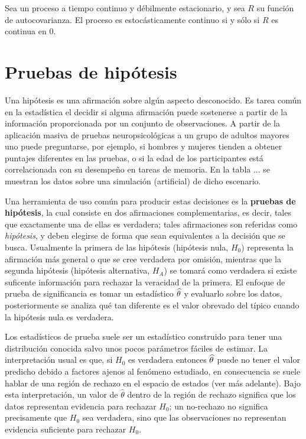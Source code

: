 \begin{proposicion}
Sea \xt un proceso a tiempo continuo y débilmente estacionario, y sea $R$ su función de autocovarianza. El proceso es estocásticamente continuo si y sólo si $R$ es continua en 0.
\end{proposicion}


\section{Pruebas de hipótesis}


Una hipótesis es una afirmación sobre algún aspecto desconocido.
%
Es tarea común en la estadística el decidir si alguna afirmación puede sostenerse a partir de la
información proporcionada por un conjunto de observaciones. 
%
A partir de la aplicación masiva de pruebas neuropsicológicas a un grupo de adultos mayores uno 
puede preguntarse, por ejemplo, si hombres y mujeres tienden a obtener puntajes diferentes en las
pruebas, o si la edad de los participantes está correlacionada con su desempeño en tareas de 
memoria.
%
En la tabla ... se muestran los datos sobre una simulación (artificial) de dicho escenario.

Una herramienta de uso común para producir estas decisiones es la \textbf{pruebas de hipótesis},
la cual consiste en dos afirmaciones complementarias, es decir, tales que exactamente una de ellas es verdadera; tales afirmaciones
son referidas como \textit{hipótesis}, y deben elegirse de forma que sean equivalentes a la 
decisión que se busca. 
%
Usualmente la primera de las hipótesis (hipótesis nula, $H_0$) representa la afirmación más general o que se cree verdadera por omisión, mientras que la segunda hipótesis (hipótesis alternativa, $H_A$) se tomará como verdadera si
existe suficente información para rechazar la veracidad de la primera.
%
%
El enfoque de prueba de significancia es  tomar un estadístico $\widehat{ \theta }$ y evaluarlo sobre los datos, posteriormente se analiza qué tan diferente es el valor obrevado del típico cuando la hipótesis nula es verdadera.

Los estadísticos de prueba suele ser un estadístico construido para tener una distribución conocida salvo unos pocos parámetros fáciles de estimar.
%
La interpretación usual es que, si $H_0$ es verdadera entonces $\widehat{ \theta }$ puede no tener el valor predicho debido a factores ajenos al fenómeno estudiado, en consecuencia se suele hablar de una región de rechazo en el espacio de estados (ver más adelante).
%
Bajo esta interpretación, un valor de $\widehat{\theta}$ dentro de la región de rechazo significa que los datos representan evidencia para rechazar $H_0$; un no-rechazo no significa precisamente que $H_0$ sea verdadera, sino que las observaciones no representan evidencia suficiente para rechazar $H_0$.

